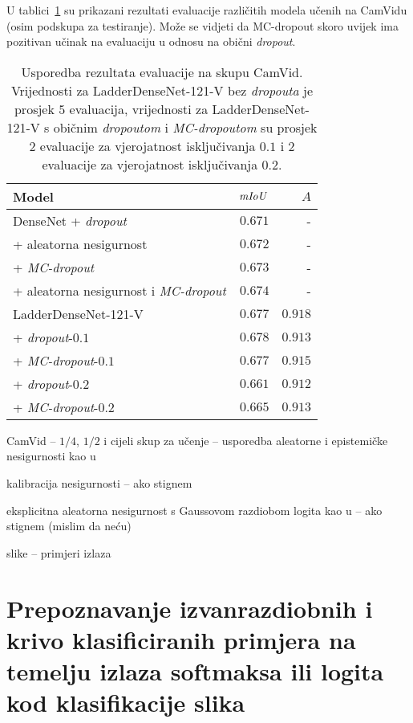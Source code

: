 \documentclass[utf8, diplomski, lmodern]{fer}
\begin{document}
U tablici~\ref{tab:evaluacija-camvid} su prikazani rezultati evaluacije različitih modela učenih na CamVidu (osim podskupa za testiranje). Može se vidjeti da MC-dropout skoro uvijek ima pozitivan učinak na evaluaciju u odnosu na obični \textit{dropout}.

\begin{table}
	\centering\small
	\begin{tabular}{lrr}
		\toprule
		\bfseries Model & $\mathit{mIoU}$ & $A$ \\
		\midrule
		DenseNet + \textit{dropout} \citep{Kendall:2017:WUNBDLCV} & $0.671$ & - \\
		+ aleatorna nesigurnost & $0.672$ & - \\
		+ \textit{MC-dropout} & $0.673$ & -  \\
		+ aleatorna nesigurnost i \textit{MC-dropout} & $0.674$ & -\\
		\midrule
		LadderDenseNet-121-V & $0.677$ & $0.918$ \\
		+ \textit{dropout}-$0.1$ & $0.678$ & $0.913$ \\
		+ \textit{MC-dropout}-$0.1$ & $0.677$ & $0.915$ \\
		+ \textit{dropout}-$0.2$ & $0.661$ & $0.912$ \\
		+ \textit{MC-dropout}-$0.2$ & $0.665$ & $0.913$
		\\\bottomrule
	\end{tabular}
	\caption{Usporedba rezultata evaluacije na skupu CamVid. Vrijednosti za LadderDenseNet-121-V bez \textit{dropouta} je prosjek $5$ evaluacija, vrijednosti za LadderDenseNet-121-V s običnim \textit{dropoutom} i \textit{MC-dropoutom} su prosjek $2$ evaluacije za vjerojatnost isključivanja $0.1$ i $2$ evaluacije za vjerojatnost isključivanja $0.2$.}
	\label{tab:evaluacija-camvid}
\end{table}



CamVid -- $1/4$, $1/2$ i cijeli skup za učenje -- usporedba aleatorne i epistemičke nesigurnosti kao u \cite{Smith:2018:UMUAED}

kalibracija nesigurnosti -- ako stignem

eksplicitna aleatorna nesigurnost s Gaussovom razdiobom logita kao u \cite{Kendall:2017:WUNBDLCV} -- ako stignem (mislim da neću)

slike -- primjeri izlaza

\section{Prepoznavanje izvanrazdiobnih i krivo klasificiranih primjera na temelju izlaza softmaksa ili logita kod klasifikacije slika}
\end{document}
